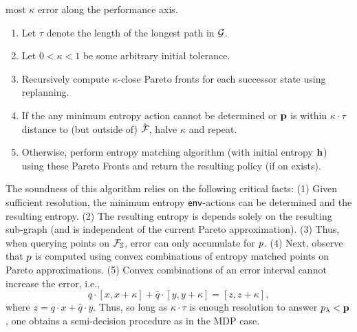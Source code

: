 most $\kappa$ error along the performance axis.
\begin{mdframed}
\begin{enumerate}
\item Let $\tau$ denote the length of the longest path in $\mathcal{G}$.
\item Let $0 < \kappa < 1$ be some arbitrary initial tolerance.
\item Recursively compute $\kappa$-close Pareto fronts for each successor state using replanning.
\item If the any minimum entropy action cannot be determined or $\mathbf{p}$ is within $\kappa\cdot \tau$ distance to (but outside of) $\hat{\mathcal{F}_{}}$,
  halve $\kappa$ and repeat.
\item Otherwise, perform entropy matching algorithm (with initial
  entropy $\mathbf{h}$) using these Pareto Fronts and return the
  resulting policy (if on exists).
\end{enumerate}  
\end{mdframed}
The soundness of this algorithm relies on the following critical
facts: (1) Given sufficient resolution, the minimum entropy
$\mathsf{env}$-actions can be determined and the resulting entropy. (2) The
resulting entropy is depends solely on
the resulting sub-graph (and is independent of the current Pareto
approximation). (3) Thus, when querying points on
$\mathcal{F}_{\mathbb{S}}$, error can only accumulate for $p$. (4) Next,
observe that $p$ is computed using convex combinations of entropy
matched points on Pareto approximations. (5) Convex combinations of an error interval cannot
increase the error, i.e.,
\begin{equation}
  q\cdot[x, x + \kappa] + \bar{q}\cdot[y, y + \kappa] = [z, z + \kappa],
\end{equation}
where $z = q\cdot x + \bar{q}\cdot y$.
Thus, so long as $\kappa\cdot\tau$ is enough resolution to answer $p_\lambda <
\mathbf{p}$, one obtains a semi-decision procedure as in the MDP
case.

